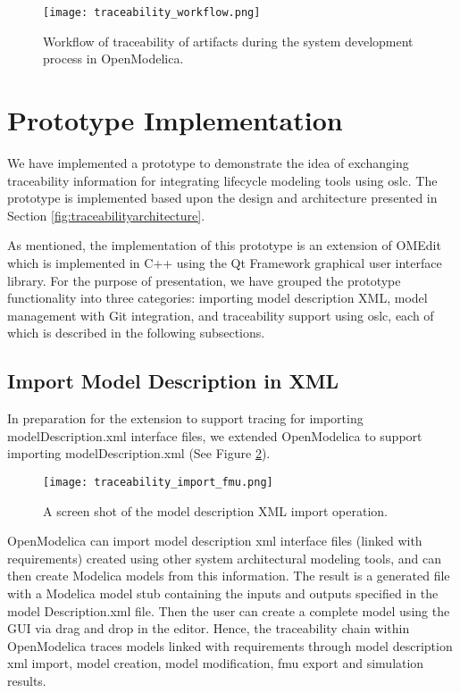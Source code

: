\begin{figure}
	\texttt{[image: traceability\_workflow.png]}
	\caption{Workflow of traceability of artifacts during the system development process in OpenModelica.}
	\label{fig:traceabilityworkflow}
\end{figure}

\section{Prototype Implementation}
\label{sec:tracaebilityprototype}

We have implemented a prototype to demonstrate the idea of exchanging traceability information for
integrating lifecycle modeling tools using \acrshort{oslc}. The prototype is implemented based upon the design and
architecture presented in Section \ref{fig:traceabilityarchitecture}.

As mentioned, the implementation of this prototype is an extension of OMEdit which
is implemented in C++ using the Qt Framework graphical user interface library. For the purpose of presentation, we have grouped the prototype functionality into three categories: importing model description XML, model management with Git integration, and traceability support using \acrshort{oslc}, 
each of which is described in the following subsections.


\subsection{Import Model Description in XML}
\label{ssec:tracaebilityimprtxml}

In preparation for the extension to support tracing for importing modelDescription.xml interface files, we 
extended OpenModelica to support importing modelDescription.xml (See Figure \ref{fig:traceabilityimportfmu}). 

\begin{figure} [!h]
	\texttt{[image: traceability\_import\_fmu.png]}
	\caption{A screen shot of the model description XML import operation.}
	\label{fig:traceabilityimportfmu}
\end{figure}

OpenModelica can import model description \acrshort{xml} interface files (linked with requirements) created using
other system architectural modeling tools, and can then create Modelica models from this information. The result is a
generated file with a Modelica model stub containing the inputs and outputs specified in the model
Description.xml file. Then the user can create a complete model using the GUI via drag and drop in the
editor. Hence, the traceability chain within OpenModelica traces models linked with requirements
through model description \acrshort{xml} import, model creation, model modification, \acrshort{fmu} export and simulation results.

